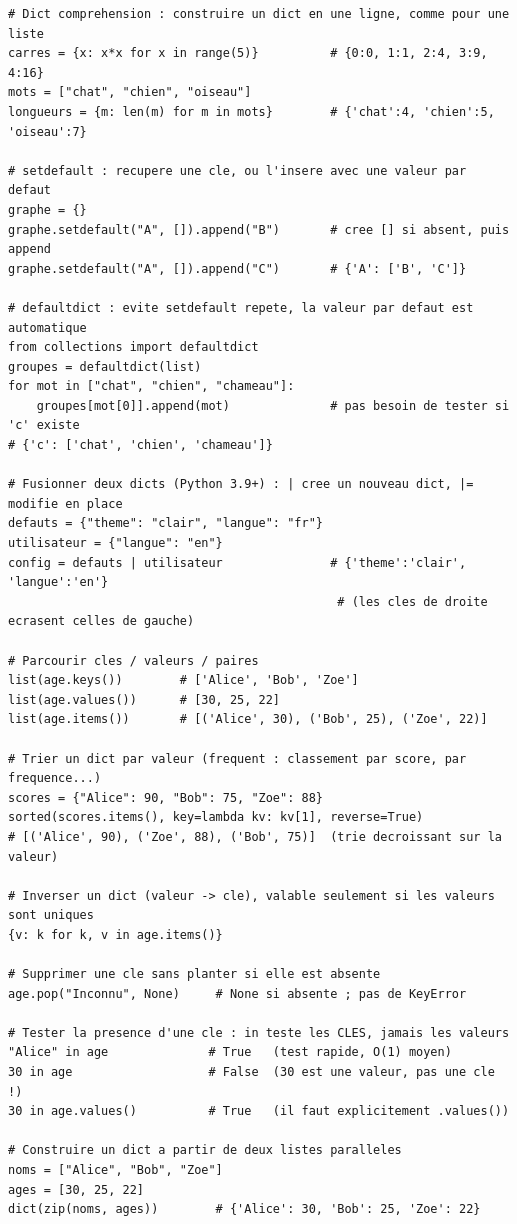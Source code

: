 \documentclass[11pt,a4paper]{article}
\begin{document}
\begin{lstlisting}
# Dict comprehension : construire un dict en une ligne, comme pour une liste
carres = {x: x*x for x in range(5)}          # {0:0, 1:1, 2:4, 3:9, 4:16}
mots = ["chat", "chien", "oiseau"]
longueurs = {m: len(m) for m in mots}        # {'chat':4, 'chien':5, 'oiseau':7}

# setdefault : recupere une cle, ou l'insere avec une valeur par defaut
graphe = {}
graphe.setdefault("A", []).append("B")       # cree [] si absent, puis append
graphe.setdefault("A", []).append("C")       # {'A': ['B', 'C']}

# defaultdict : evite setdefault repete, la valeur par defaut est automatique
from collections import defaultdict
groupes = defaultdict(list)
for mot in ["chat", "chien", "chameau"]:
    groupes[mot[0]].append(mot)              # pas besoin de tester si 'c' existe
# {'c': ['chat', 'chien', 'chameau']}

# Fusionner deux dicts (Python 3.9+) : | cree un nouveau dict, |= modifie en place
defauts = {"theme": "clair", "langue": "fr"}
utilisateur = {"langue": "en"}
config = defauts | utilisateur               # {'theme':'clair', 'langue':'en'}
                                              # (les cles de droite ecrasent celles de gauche)

# Parcourir cles / valeurs / paires
list(age.keys())        # ['Alice', 'Bob', 'Zoe']
list(age.values())      # [30, 25, 22]
list(age.items())       # [('Alice', 30), ('Bob', 25), ('Zoe', 22)]

# Trier un dict par valeur (frequent : classement par score, par frequence...)
scores = {"Alice": 90, "Bob": 75, "Zoe": 88}
sorted(scores.items(), key=lambda kv: kv[1], reverse=True)
# [('Alice', 90), ('Zoe', 88), ('Bob', 75)]  (trie decroissant sur la valeur)

# Inverser un dict (valeur -> cle), valable seulement si les valeurs sont uniques
{v: k for k, v in age.items()}

# Supprimer une cle sans planter si elle est absente
age.pop("Inconnu", None)     # None si absente ; pas de KeyError

# Tester la presence d'une cle : in teste les CLES, jamais les valeurs
"Alice" in age              # True   (test rapide, O(1) moyen)
30 in age                   # False  (30 est une valeur, pas une cle !)
30 in age.values()          # True   (il faut explicitement .values())

# Construire un dict a partir de deux listes paralleles
noms = ["Alice", "Bob", "Zoe"]
ages = [30, 25, 22]
dict(zip(noms, ages))        # {'Alice': 30, 'Bob': 25, 'Zoe': 22}


\end{lstlisting}
\end{document}
